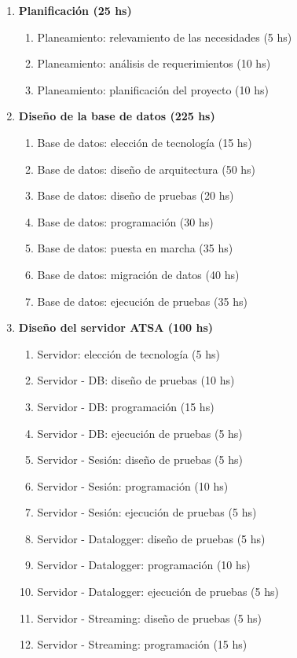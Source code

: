 \documentclass[
12pt,
spanish,
singlespacing,
parskip,
headsepline,]{article}
\begin{document}
\begin{enumerate}
	\item \textbf{Planificación (25 hs)}
	\begin{enumerate}
		\item Planeamiento: relevamiento de las necesidades (5 hs)
		\item Planeamiento: análisis de requerimientos (10 hs)
		\item Planeamiento: planificación del proyecto (10 hs)
	\end{enumerate}
	\item \textbf{Diseño de la base de datos (225 hs)}
	\begin{enumerate}
		\item Base de datos: elección de tecnología (15 hs)
		\item Base de datos: diseño de arquitectura (50 hs)
		\item Base de datos: diseño de pruebas (20 hs)
		\item Base de datos: programación (30 hs)
		\item Base de datos: puesta en marcha (35 hs)
		\item Base de datos: migración de datos (40 hs)
		\item Base de datos: ejecución de pruebas (35 hs)
	\end{enumerate}
	\item \textbf{Diseño del servidor ATSA (100 hs)}
	\begin{enumerate}
		\item Servidor: elección de tecnología (5 hs)
		\item Servidor - DB: diseño de pruebas (10 hs)
		\item Servidor - DB: programación (15 hs)
		\item Servidor - DB: ejecución de pruebas (5 hs)
		\item Servidor - Sesión: diseño de pruebas (5 hs)
		\item Servidor - Sesión: programación (10 hs)
		\item Servidor - Sesión: ejecución de pruebas (5 hs)
		\item Servidor - Datalogger: diseño de pruebas (5 hs)
		\item Servidor - Datalogger: programación (10 hs)
		\item Servidor - Datalogger: ejecución de pruebas (5 hs)
		\item Servidor - Streaming: diseño de pruebas (5 hs)
		\item Servidor - Streaming: programación (15 hs)

\end{enumerate}
\end{enumerate}
\end{document}
